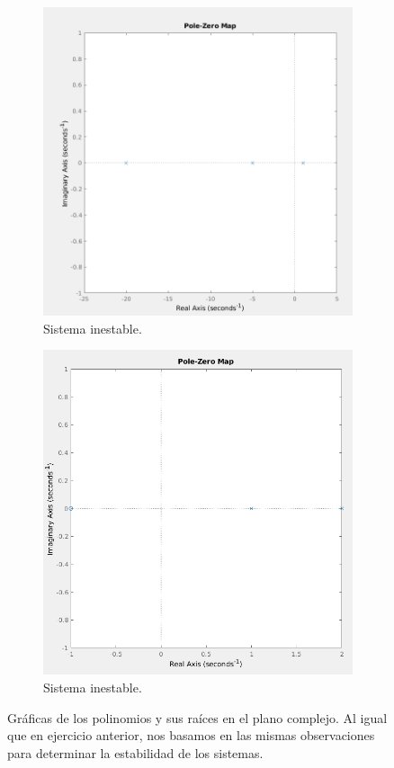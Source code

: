 \documentclass[12pt, letterpaper]{article}
\begin{document}
\begin{enumerate}
\begin{figure}[H]
\begin{subfigure}[b]{0.49\linewidth}
						\includegraphics[width=\linewidth]{4b.png}
						\caption{Sistema inestable.}
					\end{subfigure}
					\begin{subfigure}[b]{0.49\linewidth}
						\includegraphics[width=\linewidth]{4c.png}
						\caption{Sistema inestable.}
					\end{subfigure}
					\caption{Gráficas de los polinomios y sus raíces en el plano complejo. Al igual que en ejercicio anterior, nos basamos en las mismas observaciones para determinar la estabilidad de los sistemas.}
				\end{figure}
\end{enumerate}
\end{document}
